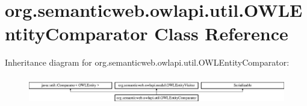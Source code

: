 \hypertarget{classorg_1_1semanticweb_1_1owlapi_1_1util_1_1_o_w_l_entity_comparator}{\section{org.\-semanticweb.\-owlapi.\-util.\-O\-W\-L\-Entity\-Comparator Class Reference}
\label{classorg_1_1semanticweb_1_1owlapi_1_1util_1_1_o_w_l_entity_comparator}
}
Inheritance diagram for org.\-semanticweb.\-owlapi.\-util.\-O\-W\-L\-Entity\-Comparator\-:\begin{figure}[H]
\begin{center}
\leavevmode
\includegraphics[height=1.228070cm]{classorg_1_1semanticweb_1_1owlapi_1_1util_1_1_o_w_l_entity_comparator}
\end{center}
\end{figure}
